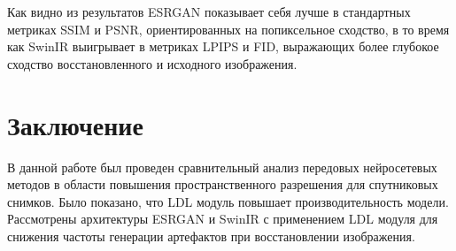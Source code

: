 \documentclass[14pt]{extarticle}
\begin{document}


Как видно из результатов ESRGAN показывает себя лучше в стандартных метриках SSIM и PSNR, ориентированных на попиксельное сходство, в то время как SwinIR выигрывает в метриках LPIPS и FID, выражающих более глубокое сходство восстановленного и исходного изображения.


\section{Заключение}

В данной работе был проведен сравнительный анализ передовых нейросетевых методов в области повышения пространственного разрешения для спутниковых снимков. Было показано, что LDL модуль повышает производительность модели. Рассмотрены архитектуры ESRGAN и SwinIR с применением LDL модуля для снижения частоты генерации артефактов при восстановлении изображения.

\printbibliography
\end{document}
